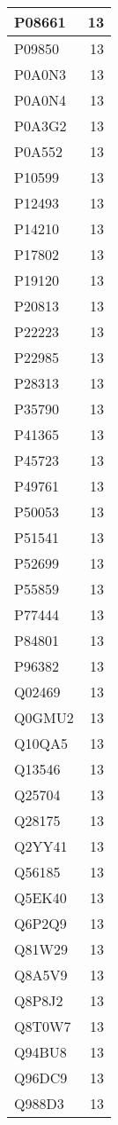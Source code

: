 \documentclass[
]{book}
\theoremstyle{definition}
\theoremstyle{definition}
\theoremstyle{definition}
\theoremstyle{definition}
\theoremstyle{remark}
\begin{document}
\begin{table}
\begin{tabular}{l|r}
\hline
P08661 & 13\\
\hline
P09850 & 13\\
\hline
P0A0N3 & 13\\
\hline
P0A0N4 & 13\\
\hline
P0A3G2 & 13\\
\hline
P0A552 & 13\\
\hline
P10599 & 13\\
\hline
P12493 & 13\\
\hline
P14210 & 13\\
\hline
P17802 & 13\\
\hline
P19120 & 13\\
\hline
P20813 & 13\\
\hline
P22223 & 13\\
\hline
P22985 & 13\\
\hline
P28313 & 13\\
\hline
P35790 & 13\\
\hline
P41365 & 13\\
\hline
P45723 & 13\\
\hline
P49761 & 13\\
\hline
P50053 & 13\\
\hline
P51541 & 13\\
\hline
P52699 & 13\\
\hline
P55859 & 13\\
\hline
P77444 & 13\\
\hline
P84801 & 13\\
\hline
P96382 & 13\\
\hline
Q02469 & 13\\
\hline
Q0GMU2 & 13\\
\hline
Q10QA5 & 13\\
\hline
Q13546 & 13\\
\hline
Q25704 & 13\\
\hline
Q28175 & 13\\
\hline
Q2YY41 & 13\\
\hline
Q56185 & 13\\
\hline
Q5EK40 & 13\\
\hline
Q6P2Q9 & 13\\
\hline
Q81W29 & 13\\
\hline
Q8A5V9 & 13\\
\hline
Q8P8J2 & 13\\
\hline
Q8T0W7 & 13\\
\hline
Q94BU8 & 13\\
\hline
Q96DC9 & 13\\
\hline
Q988D3 & 13\\

\end{tabular}
\end{table}
\end{document}
